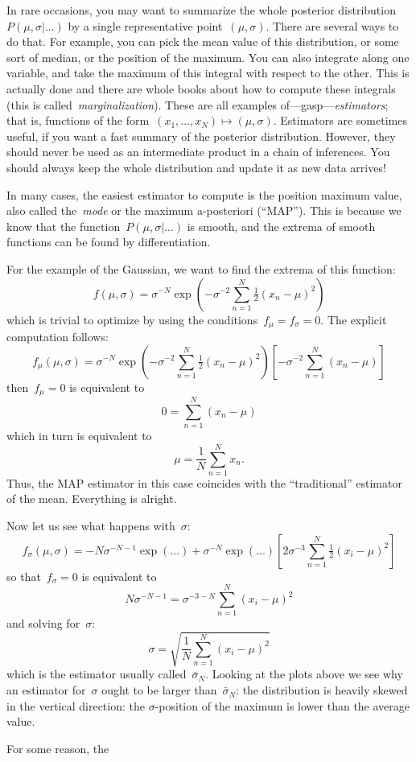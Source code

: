 In rare occasions, you may want to summarize the whole posterior
distribution~$P(\mu,\sigma|\ldots)$ by a single representative
point~$(\mu,\sigma)$.  There are several ways to do that.  For example, you
can pick the mean value of this distribution, or some sort of median, or the
position of the maximum.  You can also integrate along one variable, and take
the maximum of this integral with respect to the other.  This is actually
done and there are whole books about how to compute these integrals (this is
called~\emph{marginalization}).  These are all examples
of---gasp---\emph{estimators}; that is, functions of the
form~$(x_1,\ldots,x_N)\mapsto(\mu,\sigma)$.  Estimators are sometimes useful,
if you want a fast summary of the posterior distribution.  However, they
should never be used as an intermediate product in a chain of inferences.
You should always keep the whole distribution and update it as new data
arrives!

In many cases, the easiest estimator to compute is the position maximum
value, also called the~\emph{mode} or the maximum a-posteriori (``MAP'').
This is because we know that the function~$P(\mu,\sigma|\ldots)$ is smooth,
and the extrema of smooth functions can be found by differentiation.

For the example of the Gaussian, we want to find the extrema of this
function:
$$
f(\mu,\sigma)
=
\sigma^{-N}\exp\left(-\sigma^{-2}\sum_{n=1}^N\tfrac{1}{2}(x_n-\mu)^2\right)
$$
which is trivial to optimize by using the conditions~$f_\mu=f_\sigma=0$.
The explicit computation follows:
$$
f_\mu(\mu,\sigma)
=
\sigma^{-N}\exp\left(-\sigma^{-2}\sum_{n=1}^N\tfrac{1}{2}(x_n-\mu)^2\right)
\left[
	-\sigma^{-2}\sum_{n=1}^N(x_n-\mu)
\right]
$$
then~$f_\mu=0$ is equivalent to
$$
0 = \sum_{n=1}^N(x_n-\mu)
$$
which in turn is equivalent to
$$
\mu=\frac{1}{N}\sum_{n=1}^Nx_n.
$$
Thus, the MAP estimator in this case coincides with the ``traditional''
estimator of the mean.  Everything is alright.

Now let us see what happens with~$\sigma$:
$$
f_\sigma(\mu,\sigma)
=
-N\sigma^{-N-1}\exp\left(...\right)
+\sigma^{-N}\exp\left(...\right)
\left[
	2\sigma^{-3}\sum_{n=1}^N\tfrac{1}{2}(x_i-\mu)^2
\right]
$$
so that~$f_\sigma=0$ is equivalent to
$$
N\sigma^{-N-1}
=
\sigma^{-3-N}\sum_{n=1}^N(x_i-\mu)^2
$$
and solving for~$\sigma$:
$$
\sigma=\sqrt{\frac{1}{N}\sum_{n=1}^N(x_i-\mu)^2}
$$
which is the estimator usually called~$\bar\sigma_{N}$.  Looking at the
plots above we see why an estimator for~$\sigma$ ought to be larger
than~$\bar\sigma_{N}$: the distribution is heavily skewed in the vertical
direction: the $\sigma$-position of the maximum is lower than the average
value.

For some reason, the 



